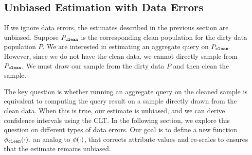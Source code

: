 \subsection{Unbiased Estimation with Data Errors}
If we ignore data errors, the estimates described in the previous section are unbiased.
Suppose $P_{\texttt{clean} }$ is the corresponding clean population for the dirty data population $P$.
We are interested in estimating an aggregate query on $P_{\texttt{clean} }$.
However, since we do not have the clean data, we cannot directly sample from $P_{\texttt{clean} }$.
We must draw our sample from the dirty data $P$ and then clean the sample.

The key question is whether running an aggregate query on the cleaned sample is equivalent to computing the query result on a sample directly drawn from the clean data.
When this is true, our estimate is unbiased, and we can derive confidence intervals using the CLT.
In the following section, we explore this question on different types of data errors.
Our goal is to define a new function $\phi_{\texttt{clean} } (\cdot)$, an analog to $\phi (\cdot)$, that corrects attribute values and re-scales to ensures that the estimate remains unbiased.

